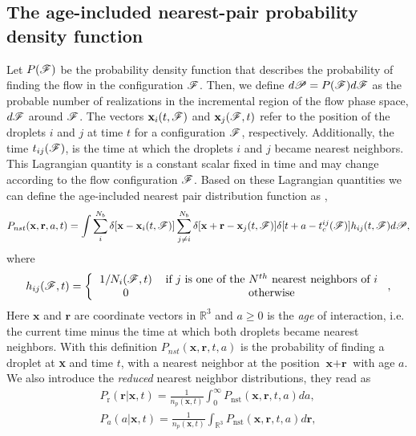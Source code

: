 \subsection{The age-included nearest-pair probability density function}
Let $P(\mathscr{F})$ be the probability density function that describes the probability of finding the flow in the configuration $\mathscr{F}$.
Then, we define $d\mathscr{P} = P(\mathscr{F})d\mathscr{F}$ as the probable number of realizations in the incremental region of the flow phase space, $d\mathscr{F}$ around $\mathscr{F}$.
The vectors  $\textbf{x}_i(t,\mathscr{F})$ and $\textbf{x}_j(\mathscr{F},t)$ refer to the position of the droplets $i$ and $j$ at time $t$ for a configuration $\mathscr{F}$, respectively. 
Additionally, the time $t_{ij}(\mathscr{F})$, is the time at which the droplets $i$ and $j$ became nearest neighbors.
This Lagrangian quantity is a constant scalar fixed in time and may change according to the flow configuration $\mathscr{F}$.
Based on these Lagrangian quantities we can define the age-included nearest pair distribution function as \citep{zhang2023evolution},
\begin{equation}
    P_{nst}(\textbf{x},\textbf{r},a,t) =
    \int \sum_{i}^{N_b}\delta[\textbf{x}-\textbf{x}_i(t,\FF)]
    \sum_{j\neq i}^{N_b}\delta[\textbf{x}+\textbf{r}-\textbf{x}_j(t,\FF)]
    \delta[t+a-t_c^{ij}(\FF)] 
    h_{ij} (t,\FF)
    d\mathscr{P},
    \label{eq:P_nstij}
\end{equation}
where
\begin{equation*}
    h_{ij}(\FF,t)
    = \left\{
        \begin{tabular}{cc}
            $1/N_i(\FF,t)$ & if $j$ is one of the $N^{th}$ nearest neighbors of $i$ \\
            0& otherwise
        \end{tabular}
        \right.,
\end{equation*}
Here $\textbf{x}$ and $\textbf{r}$ are coordinate vectors in $\mathbb{R}^3$ and $a \geq 0 $ is the \textit{age} of interaction, i.e. the current time minus the time at which both droplets became nearest neighbors.   
With this definition $P_{nst}(\textbf{x},\textbf{r},t,a)$ is the probability of finding a droplet at \textbf{x} and time $t$, with a nearest neighbor at the position $\textbf{x}+\textbf{r}$ with age $a$.
We also introduce the \textit{reduced} nearest neighbor distributions, they read as
\begin{align}
    P_\text{r}(\textbf{r}|\textbf{x},t)
    =\frac{1}{n_p(\textbf{x},t)}\int_0^\infty P_\text{nst}(\textbf{x},\textbf{r},t,a) da,\\
    P_a(a|\textbf{x},t)
    = \frac{1}{n_p(\textbf{x},t)}\int_{\mathbb{R}^3} P_\text{nst}(\textbf{x},\textbf{r},t,a) d\textbf{r},
\end{align}
